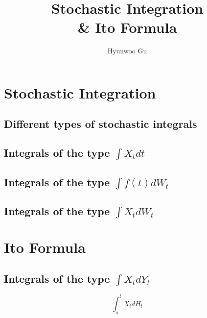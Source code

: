 \documentclass[12pt]{article}
\theoremstyle{nonumberbreak}
\begin{document}
\title{\textbf{Stochastic Integration \\ \& Ito Formula}}
\author{Hyunwoo Gu}
\date{}

\maketitle


\section{Stochastic Integration}

\subsection{Different types of stochastic integrals}

\subsection{Integrals of the type $\int X_t dt$}


\subsection{Integrals of the type $\int f(t) d W_t$}

\subsection{Integrals of the type $\int X_t d W_t$}



\pagebreak
\section{Ito Formula}


\subsection{Integrals of the type $\int X_t d Y_t$}

$$
\int_a^l X_t dH_t
$$
\end{document}
